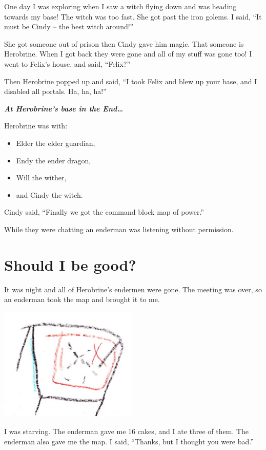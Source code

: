 \documentclass[12pt,oneside]{krantz}
\providecommand{\tightlist}{%
  \setlength{\itemsep}{0pt}\setlength{\parskip}{0pt}}
\begin{document}
One day I was exploring when I saw a witch flying down and was heading
towards my base! The witch was too fast. She got past the iron golems. I
said, ``It must be Cindy -- the best witch around!''

She got someone out of prison then Cindy gave him magic. That someone is
Herobrine. When I got back they were gone and all of my stuff was gone
too! I went to Felix's house, and said, ``Felix?''

Then Herobrine popped up and said, ``I took Felix and blew up your base,
and I disabled all portals. Ha, ha, ha!''

\textbf{\emph{At Herobrine's base in the End\ldots{}}}

Herobrine was with:

\begin{itemize}
\tightlist
\item
  Elder the elder guardian,
\item
  Endy the ender dragon,
\item
  Will the wither,
\item
  and Cindy the witch.
\end{itemize}

Cindy said, ``Finally we got the command block map of power.''

While they were chatting an enderman was listening without permission.

\hypertarget{should-i-be-good}{%
\chapter{Should I be good?}\label{should-i-be-good}}

It was night and all of Herobrine's endermen were gone. The meeting was
over, so an enderman took the map and brought it to me.

\includegraphics[width=2.60417in,height=\textheight]{img/table-and-map.jpg}

I was starving. The enderman gave me 16 cakes, and I ate three of them.
The enderman also gave me the map. I said, ``Thanks, but I thought you
were bad.''
\end{document}
